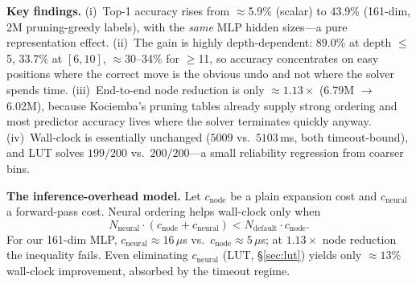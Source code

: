 \documentclass[graybox]{svmult}
\begin{document}
\begin{table}[!t]
\centering
\caption{Coordinate features: accuracy and search impact (200 scrambles, seed 42, $K{=}5$, 5\,s timeout). The LUT row is the retrained-model distillation described in Section~\ref{sec:lut}.}
\label{tab:coord-features}
\end{table}

\textbf{Key findings.} (i)~Top-1 accuracy rises from $\approx$5.9\% (scalar) to 43.9\% (161-dim, 2M pruning-greedy labels), with the \emph{same} MLP hidden sizes---a pure representation effect. (ii)~The gain is highly depth-dependent: $89.0\%$ at depth $\leq$5, $33.7\%$ at $[6,10]$, $\approx$30--34\% for $\geq$11, so accuracy concentrates on easy positions where the correct move is the obvious undo and not where the solver spends time. (iii)~End-to-end node reduction is only $\approx$$1.13\times$ (6.79M $\to$ 6.02M), because Kociemba's pruning tables already supply strong ordering and most predictor accuracy lives where the solver terminates quickly anyway. (iv)~Wall-clock is essentially unchanged ($5009$ vs.\ $5103$\,ms, both timeout-bound), and LUT solves $199/200$ vs.\ $200/200$---a small reliability regression from coarser bins.

\textbf{The inference-overhead model.} Let $c_{\text{node}}$ be a plain expansion cost and $c_{\text{neural}}$ a forward-pass cost. Neural ordering helps wall-clock only when
\begin{equation}
\label{eq:overhead}
N_{\text{neural}} \cdot (c_{\text{node}} + c_{\text{neural}}) < N_{\text{default}} \cdot c_{\text{node}}.
\end{equation}
For our 161-dim MLP, $c_{\text{neural}} \approx 16\,\mu$s vs.\ $c_{\text{node}} \approx 5\,\mu$s; at $1.13\times$ node reduction the inequality fails. Even eliminating $c_{\text{neural}}$ (LUT, §\ref{sec:lut}) yields only $\approx$$13\%$ wall-clock improvement, absorbed by the timeout regime.
\end{document}
